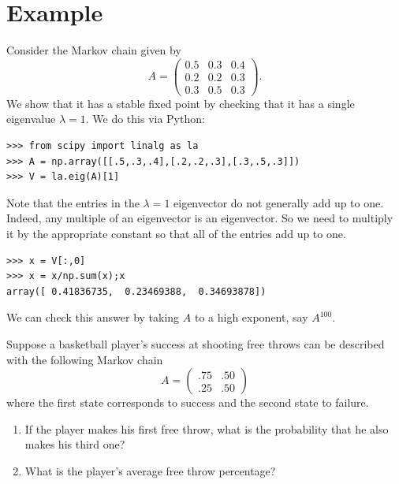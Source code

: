 \section*{Example}
Consider the Markov chain given by
\[
A = \begin{pmatrix}
0.5 & 0.3 & 0.4\\
0.2 & 0.2 & 0.3\\
0.3 & 0.5 & 0.3
\end{pmatrix}.
\]
We show that it has a stable fixed point by checking that it has a single eigenvalue $\lambda=1$.
We do this via Python:
\begin{lstlisting}
>>> from scipy import linalg as la
>>> A = np.array([[.5,.3,.4],[.2,.2,.3],[.3,.5,.3]])
>>> V = la.eig(A)[1]
\end{lstlisting}
Note that the entries in the $\lambda=1$ eigenvector do not generally add up to one.
Indeed, any multiple of an eigenvector is an eigenvector.
So we need to multiply it by the appropriate constant so that all of the entries add up to one.
\begin{lstlisting}
>>> x = V[:,0]
>>> x = x/np.sum(x);x
array([ 0.41836735,  0.23469388,  0.34693878])
\end{lstlisting}
We can check this answer by taking $A$ to a high exponent, say $A^{100}$.

\begin{problem}
Suppose a basketball player's success at shooting free throws can be described with the following Markov chain
\[
A = \begin{pmatrix}.75&.50\\.25&.50\end{pmatrix}
\]
where the first state corresponds to success and the second state to failure.
\begin{enumerate}
\item If the player makes his first free throw, what is the probability that he also makes his third one?
\item What is the player's average free throw percentage?
\end{enumerate}
\end{problem}

